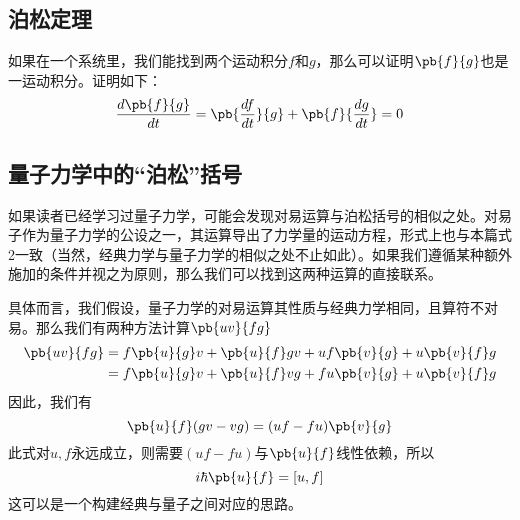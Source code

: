 \subsection{泊松定理}
如果在一个系统里，我们能找到两个运动积分$f$和$g$，那么可以证明$\pb{f}{g}$也是一运动积分。证明如下：
\begin{equation}
\frac{d\pb{f}{g}}{dt}=\pb{\frac{df}{dt}}{g}+\pb{f}{\frac{dg}{dt}}=0
\end{equation}
\subsection{量子力学中的“泊松”括号}
如果读者已经学习过量子力学，可能会发现对易运算与泊松括号的相似之处。对易子作为量子力学的公设之一，其运算导出了力学量的运动方程，形式上也与本篇式2一致（当然，经典力学与量子力学的相似之处不止如此）。如果我们遵循某种额外施加的条件并视之为原则，那么我们可以找到这两种运算的直接联系。

具体而言，我们假设，量子力学的对易运算其性质与经典力学相同，且算符不对易。那么我们有两种方法计算$\pb{uv}{fg}$
\begin{equation}
\begin{aligned}
\pb{uv}{fg}&=f\pb{u}{g}v+\pb{u}{f}gv+uf\pb{v}{g}+u\pb{v}{f}g\\
&=f\pb{u}{g}v+\pb{u}{f}vg+fu\pb{v}{g}+u\pb{v}{f}g
\end{aligned}
\end{equation}
因此，我们有
\begin{equation}
\pb{u}{f}(gv-vg)=(uf-fu)\pb{v}{g}
\end{equation}
此式对$u,f$永远成立，则需要$(uf-fu)$与$\pb{u}{f}$线性依赖，所以
\begin{equation}
i\hbar\pb{u}{f}=[u,f]
\end{equation}
这可以是一个构建经典与量子之间对应的思路。

